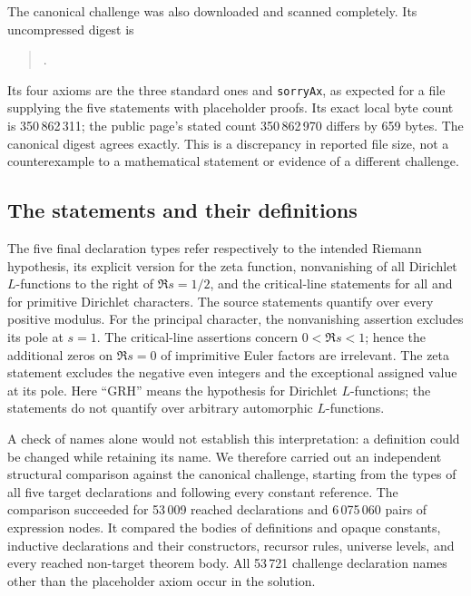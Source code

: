 \documentclass[11pt,a4paper]{article}
\theoremstyle{remark}
\begin{document}
The canonical challenge was also downloaded and scanned completely.  Its
uncompressed digest is
\begin{quote}\small\ttfamily
{}.
\end{quote}
Its four axioms are the three standard ones and \texttt{sorryAx}, as expected
for a file supplying the five statements with placeholder proofs.  Its exact
local byte count is 350\,862\,311; the public page's stated count
350\,862\,970 differs by 659 bytes.  The canonical digest agrees exactly.
This is a discrepancy in reported file size, not a counterexample to a
mathematical statement or evidence of a different challenge.

\subsection{The statements and their definitions}

The five final declaration types refer respectively to the intended Riemann
hypothesis, its explicit version for the zeta function, nonvanishing of all
Dirichlet $L$-functions to the right of $\Re s=1/2$, and the critical-line
statements for all and for primitive Dirichlet characters.  The source
statements quantify over every positive modulus.  For the principal character,
the nonvanishing assertion excludes its pole at $s=1$.  The critical-line
assertions concern $0<\Re s<1$; hence the additional zeros on $\Re s=0$ of
imprimitive Euler factors are irrelevant.  The zeta statement excludes the
negative even integers and the exceptional assigned value at its pole.
Here ``GRH'' means the hypothesis for Dirichlet $L$-functions; the statements
do not quantify over arbitrary automorphic $L$-functions.

A check of names alone would not establish this interpretation: a definition
could be changed while retaining its name.  We therefore carried out an
independent structural comparison against the canonical challenge, starting
from the types of all five target declarations and following every constant
reference.  The comparison succeeded for 53\,009 reached declarations and
6\,075\,060 pairs of expression nodes.  It compared the bodies of definitions
and opaque constants, inductive declarations and their constructors,
recursor rules, universe levels, and every reached non-target theorem body.
All 53\,721 challenge declaration names other than the placeholder axiom
occur in the solution.
\end{document}

